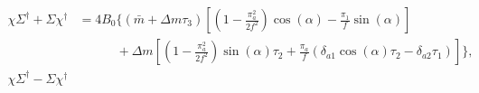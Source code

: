 \documentclass{article}
\begin{document}
\begin{align*}
    \chi \Sigma^\dagger + \Sigma \chi^\dagger
    & = 4 B_0 \Bigg\{
         (\bar m + \Delta m \tau_3)
        \left[
            \left(
                1 
                - \frac{\pi_a^2}{2f^2}
            \right)
            \cos(\alpha)
            - \frac{\pi_1}{f}    
            \sin(\alpha)
        \right]\\
    & \quad \quad \quad
    + \Delta m 
    \left[
        \left(
            1 
            - \frac{\pi_a^2}{2f^2}
        \right)
        \sin(\alpha) \tau_2
        +  \frac{\pi_a}{f}
        \left(
            \delta_{a1} \cos(\alpha) \tau_2 - \delta_{a2}\tau_1
        \right)
    \right]
    \Bigg\}, \\
    \chi \Sigma^\dagger  - \Sigma \chi^\dagger

\end{align*}
\end{document}
